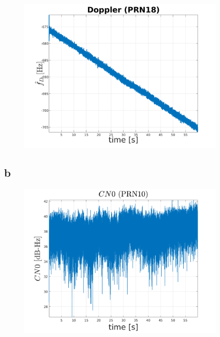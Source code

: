 \begin{figure}[H]
	\centering
	\includegraphics[width=0.9\textwidth]{fig/doppler_PRN18.png}
\end{figure}


\subsection{b}

\begin{figure}[H]
	\centering
	\includegraphics[width=0.9\textwidth]{fig/CN0_PRN10.png}
\end{figure}

